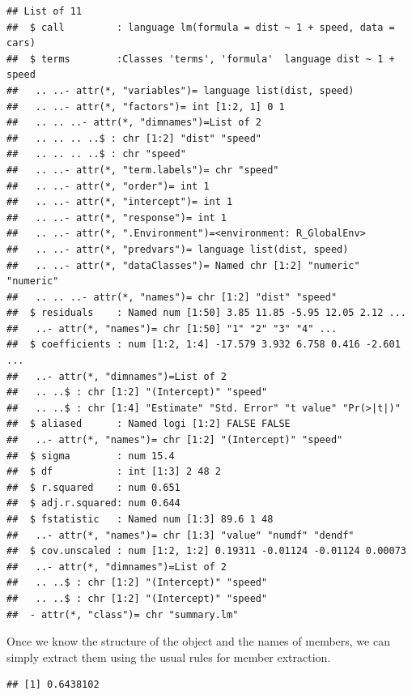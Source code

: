 \documentclass[krantz2]{krantz}\usepackage{knitr}
\begin{document}
\begin{explainbox}
\begin{knitrout}\footnotesize
{}\color{fgcolor}\begin{kframe}
\begin{alltt}
\hlstd{(}
\end{alltt}
\begin{verbatim}
## List of 11
##  $ call         : language lm(formula = dist ~ 1 + speed, data = cars)
##  $ terms        :Classes 'terms', 'formula'  language dist ~ 1 + speed
##   .. ..- attr(*, "variables")= language list(dist, speed)
##   .. ..- attr(*, "factors")= int [1:2, 1] 0 1
##   .. .. ..- attr(*, "dimnames")=List of 2
##   .. .. .. ..$ : chr [1:2] "dist" "speed"
##   .. .. .. ..$ : chr "speed"
##   .. ..- attr(*, "term.labels")= chr "speed"
##   .. ..- attr(*, "order")= int 1
##   .. ..- attr(*, "intercept")= int 1
##   .. ..- attr(*, "response")= int 1
##   .. ..- attr(*, ".Environment")=<environment: R_GlobalEnv> 
##   .. ..- attr(*, "predvars")= language list(dist, speed)
##   .. ..- attr(*, "dataClasses")= Named chr [1:2] "numeric" "numeric"
##   .. .. ..- attr(*, "names")= chr [1:2] "dist" "speed"
##  $ residuals    : Named num [1:50] 3.85 11.85 -5.95 12.05 2.12 ...
##   ..- attr(*, "names")= chr [1:50] "1" "2" "3" "4" ...
##  $ coefficients : num [1:2, 1:4] -17.579 3.932 6.758 0.416 -2.601 ...
##   ..- attr(*, "dimnames")=List of 2
##   .. ..$ : chr [1:2] "(Intercept)" "speed"
##   .. ..$ : chr [1:4] "Estimate" "Std. Error" "t value" "Pr(>|t|)"
##  $ aliased      : Named logi [1:2] FALSE FALSE
##   ..- attr(*, "names")= chr [1:2] "(Intercept)" "speed"
##  $ sigma        : num 15.4
##  $ df           : int [1:3] 2 48 2
##  $ r.squared    : num 0.651
##  $ adj.r.squared: num 0.644
##  $ fstatistic   : Named num [1:3] 89.6 1 48
##   ..- attr(*, "names")= chr [1:3] "value" "numdf" "dendf"
##  $ cov.unscaled : num [1:2, 1:2] 0.19311 -0.01124 -0.01124 0.00073
##   ..- attr(*, "dimnames")=List of 2
##   .. ..$ : chr [1:2] "(Intercept)" "speed"
##   .. ..$ : chr [1:2] "(Intercept)" "speed"
##  - attr(*, "class")= chr "summary.lm"
\end{verbatim}
\end{kframe}
\end{knitrout}

Once we know the structure of the object and the names of members, we can simply extract them using the usual \Rlang rules for member extraction.

\begin{knitrout}\footnotesize
{}\color{fgcolor}\begin{kframe}
\begin{alltt}
\hlopt{$}
\end{alltt}
\begin{verbatim}
## [1] 0.6438102
\end{verbatim}
\end{kframe}
\end{knitrout}


\end{explainbox}
\end{document}
